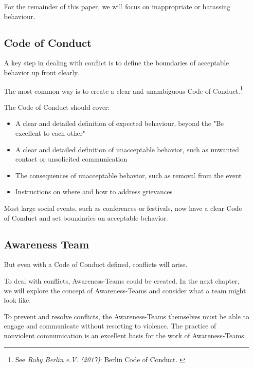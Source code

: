 For the remainder of this paper, we will focus on inappropriate or harassing behaviour.

\subsection{Code of Conduct}

A key step in dealing with conflict is to define the boundaries of acceptable behavior up front clearly.

The most common way is to create a clear and unambiguous Code of Conduct.\footnote{See \textit{Ruby Berlin e.V. (2017)}: Berlin Code of Conduct. \cite{coc}}

The Code of Conduct should cover:

\begin{itemize}
    \item A clear and detailed definition of expected behaviour, beyond the "Be excellent to each other"
    \item A clear and detailed definition of unacceptable behavior, such as unwanted contact or unsolicited communication
    \item The consequences of unacceptable behavior, such as removal from the event
    \item Instructions on where and how to address grievances
\end{itemize}

Most large social events, such as conferences or festivals, now have a clear Code of Conduct and set boundaries on acceptable behavior.

\subsection{Awareness Team}

But even with a Code of Conduct defined, conflicts will arise.

To deal with conflicts, Awareness-Teams could be created. In the next chapter, we will explore the concept of Awareness-Teams and consider what a team might look like.

To prevent and resolve conflicts, the Awareness-Teams themselves must be able to engage and communicate without resorting to violence. The practice of nonviolent communication is an excellent basis for the work of Awareness-Teams.
